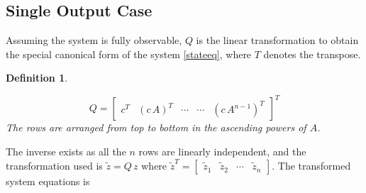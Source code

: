 \documentclass{elsarticle}
\newtheorem{Definition}{Definition}
\numberwithin{equation}{section}
\begin{document}
\subsection{Single Output Case}\label{siso_o}

Assuming the system is fully observable, $Q$ is the linear transformation to obtain the special canonical form of the system \eqref{stateeq}, where $T$ denotes the transpose. \\

\begin{Definition}\label{Form1}

\begin{equation}
	Q = \begin{bmatrix}
   	c^T & (c\,A)^T & \cdots & \cdots& (c\,{A^{n-1}})^T
 	\end{bmatrix}^T
\end{equation}
The rows are arranged from top to bottom in the ascending powers of $A$. 

\end{Definition}

The inverse exists as all the $n$ rows are linearly independent, and the transformation used is $\widetilde{z}=Q\,z$ where $\widetilde{z}^T=\begin{bmatrix} \widetilde{z}_1 & \widetilde{z}_2 & \cdots& \widetilde{z}_n\end{bmatrix}$. The transformed system equations is
\end{document}

